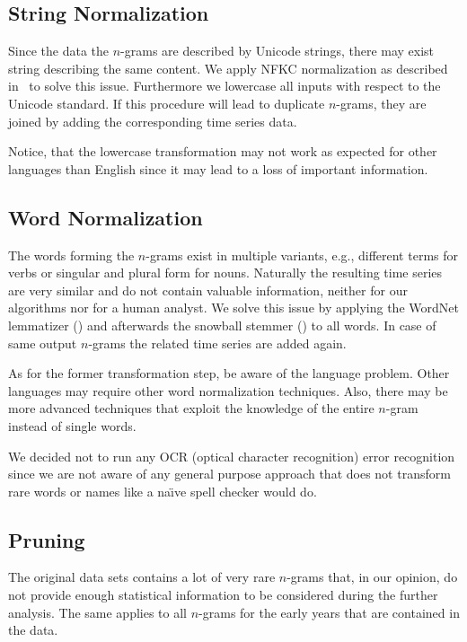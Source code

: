 \subsection{String Normalization}
\label{ssec:baseline:data:snorm}
Since the data the $n$-grams are described by Unicode strings, there may exist string describing the same content. We apply NFKC normalization as described in~\cite{unicode8annex15} to solve this issue. Furthermore we lowercase all inputs with respect to the Unicode standard. If this procedure will lead to duplicate $n$-grams, they are joined by adding the corresponding time series data.

Notice, that the lowercase transformation may not work as expected for other languages than English since it may lead to a loss of important information.


\subsection{Word Normalization}
\label{ssec:baseline:data:wnorm}
The words forming the $n$-grams exist in multiple variants, e.g., different terms for verbs or singular and plural form for nouns. Naturally the resulting time series are very similar and do not contain valuable information, neither for our algorithms nor for a human analyst. We solve this issue by applying the WordNet lemmatizer (\cite{wordnet}) and afterwards the snowball stemmer (\cite{porter2}) to all words. In case of same output $n$-grams the related time series are added again.

As for the former transformation step, be aware of the language problem. Other languages may require other word normalization techniques. Also, there may be more advanced techniques that exploit the knowledge of the entire $n$-gram instead of single words.

We decided not to run any OCR (optical character recognition) error recognition since we are not aware of any general purpose approach that does not transform rare words or names like a na\"{\i}ve spell checker would do.


\subsection{Pruning}
\label{ssec:baseline:data:prune}
The original data sets contains a lot of very rare $n$-grams that, in our opinion, do not provide enough statistical information to be considered during the further analysis. The same applies to all $n$-grams for the early years that are contained in the data.

